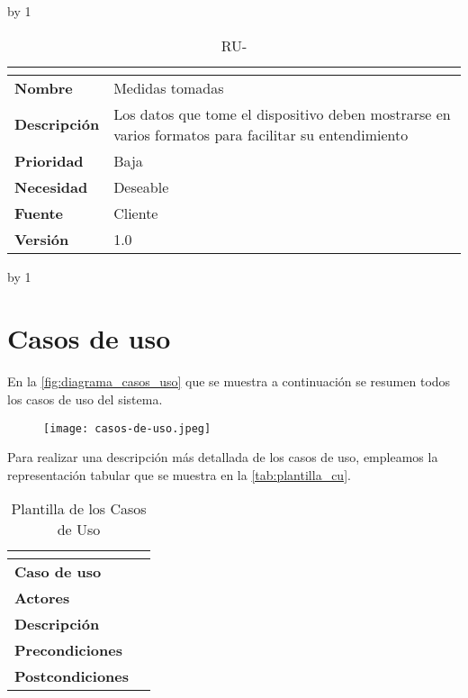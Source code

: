 \advance\ru by 1
\begin{table}[H]
	\caption{RU-\number\ru}
	\begin{tabular}{|l|p{}|}
		\hline
		\multicolumn{2}{|c|}{\cellcolor[HTML]{BFBFBF}{\color[HTML]{000000} \textbf{RU-\number\ru}}} \\ \hline
		\textbf{Nombre}      & Medidas tomadas                                                                                      \\ \hline
		\textbf{Descripción} & Los datos que tome el dispositivo deben mostrarse en varios formatos para facilitar su entendimiento \\ \hline
		\textbf{Prioridad}   & Baja                                                                                                 \\ \hline
		\textbf{Necesidad}   & Deseable                                                                                             \\ \hline
		\textbf{Fuente}      & Cliente                                                                                              \\ \hline
		\textbf{Versión}     & 1.0                                                                                                  \\ \hline
	\end{tabular}
\end{table}
\advance\ru by 1
\pagebreak

\section{Casos de uso}\label{sec:casos-de-uso}
En la \autoref{fig:diagrama_casos_uso} que se muestra a continuación se resumen todos los casos de uso del sistema.

\begin{figure}[H]
	{\texttt{[image: casos-de-uso.jpeg]}}
\end{figure}

Para realizar una descripción más detallada de los casos de uso, empleamos la representación tabular que se muestra en la \autoref{tab:plantilla_cu}.
\begin{table}[H]
	\centering
	\caption{Plantilla de los Casos de Uso}
	\label{tab:plantilla_cu}
	\begin{tabular}{|l|p{}|}
		\hline
		\multicolumn{2}{|c|}{\cellcolor[HTML]{BFBFBF}{\color[HTML]{000000} \textbf{CU-XX}}} \\ \hline
		\textbf{Caso de uso}     &   \\ \hline
		\textbf{Actores}         &   \\ \hline
		\textbf{Descripción}     &   \\ \hline
		\textbf{Precondiciones}  &   \\ \hline
		\textbf{Postcondiciones} &   \\ \hline
	\end{tabular}
\end{table}

